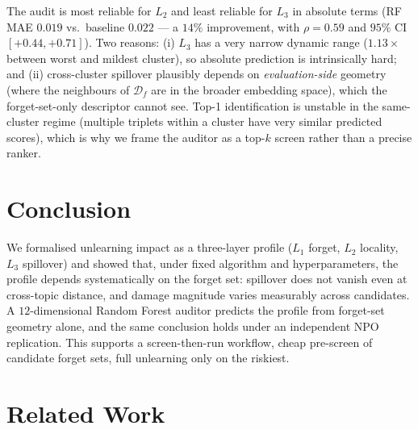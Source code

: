 \documentclass[11pt]{article}
\newcommand{\Df}{\mathcal{D}_f}
\newcommand{\Lone}{L_1}
\newcommand{\Ltwo}{L_2}
\newcommand{\Lthree}{L_3}
\begin{document}
The audit is most reliable for $\Ltwo$ and least reliable for $\Lthree$ in absolute terms (RF MAE $0.019$ vs.\ baseline $0.022$ --- a $14\%$ improvement, with $\rho{=}0.59$ and $95\%$ CI $[+0.44, +0.71]$). Two reasons: (i) $\Lthree$ has a very narrow dynamic range ($1.13\times$ between worst and mildest cluster), so absolute prediction is intrinsically hard; and (ii) cross-cluster spillover plausibly depends on \emph{evaluation-side} geometry (where the neighbours of $\Df$ are in the broader embedding space), which the forget-set-only descriptor cannot see. Top-1 identification is unstable in the same-cluster regime (multiple triplets within a cluster have very similar predicted scores), which is why we frame the auditor as a top-$k$ screen rather than a precise ranker.

\section{Conclusion}
\label{sec:conclusion}

We formalised unlearning impact as a three-layer profile ($\Lone$ forget,
$\Ltwo$ locality, $\Lthree$ spillover) and showed that, under fixed algorithm
and hyperparameters, the profile depends systematically on the forget set:
spillover does not vanish even at cross-topic distance, and damage magnitude
varies measurably across candidates. A $12$-dimensional Random Forest auditor
predicts the profile from forget-set geometry alone, and the same conclusion
holds under an independent NPO replication. This supports a screen-then-run
workflow, cheap pre-screen of candidate forget sets, full unlearning only on
the riskiest.

\section{Related Work}
\label{sec:related}
\end{document}
